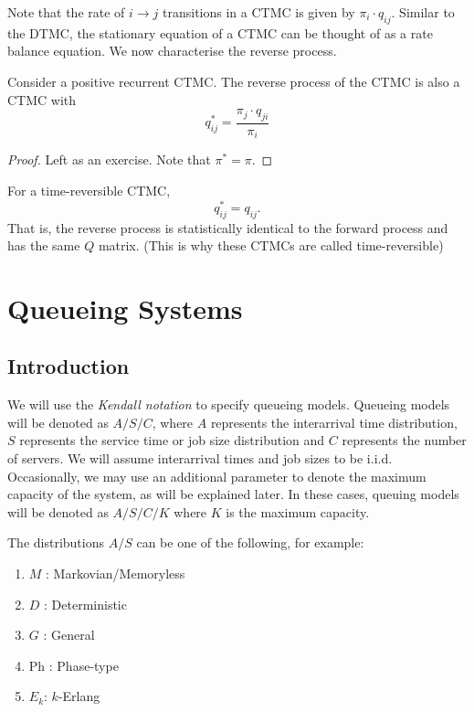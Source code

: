 \documentclass[12pt]{article}
\theoremstyle{definition}
\begin{document}
Note that the rate of $i \to j$ transitions in a CTMC is given by $\pi_i \cdot q_{ij}$. Similar to the DTMC, the stationary equation of a CTMC can be thought of as a rate balance equation. We now characterise the reverse process.

\begin{lem}
    Consider a positive recurrent CTMC. The reverse process of the CTMC is also a CTMC with 
    \[
        q^{\ast}_{ij} = \frac{\pi_j \cdot q_{ji}}{\pi_i}
    \]
\end{lem}
\begin{proof}
    Left as an exercise. Note that $\pi^{\ast} = \pi$.
\end{proof}

\begin{lem}
    For a time-reversible CTMC,
    \[
        q^{\ast}_{ij} = q_{ij}.
    \]
    That is, the reverse process is statistically identical to the forward process and has the same $Q$ matrix. (This is why these CTMCs are called time-reversible)
\end{lem}

\newpage

\section{Queueing Systems}

\subsection{Introduction}

We will use the \emph{Kendall notation} to specify queueing models. Queueing models will be denoted as $A/S/C$, where $A$ represents the interarrival time distribution, $S$ represents the service time or job size distribution and $C$ represents the number of servers. We will assume interarrival times and job sizes to be i.i.d. Occasionally, we may use an additional parameter to denote the maximum capacity of the system, as will be explained later. In these cases, queuing models will be denoted as $A/S/C/K$ where $K$ is the maximum capacity.

The distributions $A/S$ can be one of the following, for example:
\begin{enumerate}
    \item $M$ : Markovian/Memoryless
    \item $D$ : Deterministic
    \item $G$ : General
    \item Ph : Phase-type
    \item $E_k$: $k$-Erlang
\end{enumerate}
\end{document}
